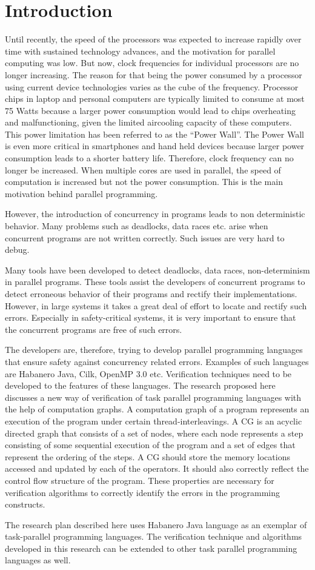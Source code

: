 \section{Introduction}

Until recently, the speed of the processors was expected to increase rapidly over time with sustained technology advances, and the motivation for parallel computing was low. But now, clock frequencies for individual processors are no longer increasing. The reason for that being the power consumed by a processor using current device technologies varies as the cube of the frequency. Processor chips in laptop and personal computers are typically limited to consume at most 75 Watts because a larger power consumption would lead to chips overheating and malfunctioning, given the limited air­cooling capacity of these computers. This power limitation has been referred to as the “Power Wall”. The Power Wall is even more critical in smart­phones and hand held devices because larger power consumption leads to a shorter battery life. Therefore, clock frequency can no longer be increased. When multiple cores are used in parallel, the speed of computation is increased but not the power consumption. This is the main motivation behind parallel programming.

 However, the introduction of concurrency in programs leads to non deterministic behavior. Many problems such as deadlocks, data races etc. arise when concurrent programs are not written correctly. Such issues are very hard to debug.
 
 Many tools have been developed to detect deadlocks, data races, non-determinism in parallel programs. These tools assist the developers of concurrent programs to detect erroneous behavior of their programs and rectify their implementations. However, in large systems it takes a great deal of effort to locate and rectify such errors. Especially in safety-critical systems, it is very important to ensure that the concurrent programs are free of such errors.
 
The developers are, therefore, trying to develop parallel programming languages that ensure safety against concurrency related errors. Examples of such languages are Habanero Java, Cilk, OpenMP 3.0 etc.  Verification techniques need to be developed to the features of these languages. The research proposed here discusses a new way of verification of task parallel programming languages with the help of computation graphs. A computation graph of a program represents an execution of the program under certain thread-interleavings. A CG is an acyclic directed graph that consists of a set of nodes, where each node represents a step consisting of some sequential execution of the program and a set of edges that represent the ordering of the steps. A CG should store the memory locations accessed and updated by each of the operators. It should also correctly reflect the control flow structure of the program. These properties are necessary for verification algorithms to correctly identify the errors in the programming constructs.

The research plan described here uses Habanero Java language as an exemplar of task-parallel programming languages. The verification technique and algorithms developed in this research can be extended to other task parallel programming languages as well.